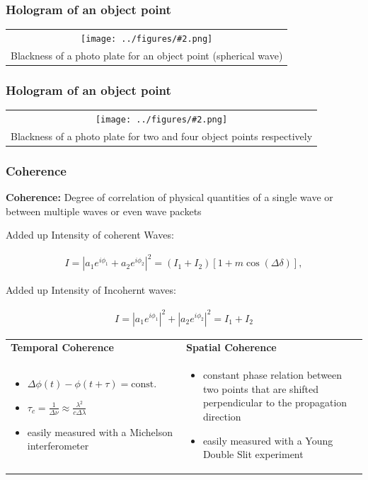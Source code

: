 \documentclass{beamer}
\newcommand{\gra}[3][]{
	\begin{table}
	\centering
	\begin{tabular}[width=\textwidth]{c}
		\texttt{[image: ../figures/\#2.png]}\\
		\small #3
	\end{tabular}
	\end{table}
}
\begin{document}
\begin{frame}
	\frametitle{Hologram of an object point}
	\gra[0.8]{obj}{Blackness of a photo plate for an object point (spherical wave) \footfullcite{staats}}
\end{frame}
\begin{frame}
	\frametitle{Hologram of an object point}
	\gra[0.5]{obj2}{Blackness of a photo plate for two and four object points respectively \footfullcite{staats}}
\end{frame}
\begin{frame}
	\frametitle{Coherence}
	\textbf{Coherence:} Degree of correlation of physical quantities of a single wave or between multiple waves or even wave packets
	
	Added up Intensity of coherent Waves:
	
	\begin{align}
	I=\left| a_1 e^{i \phi_1} + a_2 e^{i \phi_2} \right|^2 = \left(I_1+I_2 \right) \left[ 1 + m \cos(\Delta \delta)\right], 
	\end{align}
	
	Added up Intensity of Incohernt waves:
	
	\begin{align}
	I=\left| a_1 e^{i \phi_1} \right|^2+ \left| a_2 e^{i \phi_2}\right|^2 = I_1+I_2
	\end{align}
\end{frame}
\begin{frame}
	\begin{table}
		\centering
		\begin{tabular}{p{5cm}p{5cm}}
			\textbf{Temporal Coherence}&\textbf{Spatial Coherence}\\
			
			\begin{itemize}
				\item $\Delta \phi \left( t \right) - \phi\left( t + \tau\right)  = \text{const.}$
				\item $	\tau_c = \frac{1}{\Delta \nu} \approx \frac{\lambda^2}{c\Delta \lambda}$
				\item easily measured with a Michelson interferometer
			\end{itemize}
			&
			\begin{itemize}
				\item constant phase relation between two points that are shifted perpendicular to the propagation direction
				\item easily measured with a Young Double Slit experiment
				
			\end{itemize}
		\end{tabular}
	\end{table}
\end{frame}
\end{document}
